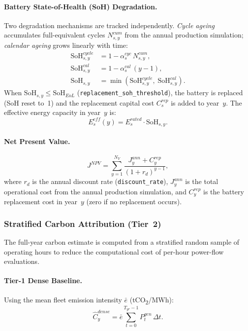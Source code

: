 \paragraph{Battery State-of-Health (SoH) Degradation.}
Two degradation mechanisms are tracked independently.
\textit{Cycle ageing} accumulates full-equivalent cycles $N_{s,y}^{cum}$ from
the annual production simulation; \textit{calendar ageing} grows linearly with
time:
\begin{align}
  \text{SoH}_{s,y}^{cycle} &= 1 - \alpha_s^{cyc}\,N_{s,y}^{cum},
    \label{eq:soh-cyc} \\
  \text{SoH}_{s,y}^{cal}   &= 1 - \alpha_s^{cal}\,(y-1),
    \label{eq:soh-cal} \\
  \text{SoH}_{s,y}         &= \min\!\left(\text{SoH}_{s,y}^{cycle},\;
                               \text{SoH}_{s,y}^{cal}\right).
    \label{eq:soh-combined}
\end{align}
When $\text{SoH}_{s,y} \leq \text{SoH}_{EoL}$
(\texttt{replacement\_soh\_threshold}), the battery is replaced (SoH reset
to~1) and the replacement capital cost $C_s^{rep}$ is added to year~$y$.
The effective energy capacity in year~$y$ is:
\begin{equation}
  E_s^{eff}(y) = E_s^{rated}\cdot\text{SoH}_{s,y}.
\end{equation}

\paragraph{Net Present Value.}
\begin{equation}
  J^{NPV} = \sum_{y=1}^{N_Y} \frac{J_y^{ann} + C_y^{rep}}{(1+r_d)^{y-1}},
  \label{eq:npv}
\end{equation}
where $r_d$ is the annual discount rate (\texttt{discount\_rate}),
$J_y^{ann}$ is the total operational cost from the annual production simulation,
and $C_y^{rep}$ is the battery replacement cost in year~$y$ (zero if no
replacement occurs).

\subsubsection{Stratified Carbon Attribution (Tier~2)}

The full-year carbon estimate is computed from a stratified random sample of
operating hours to reduce the computational cost of per-hour power-flow
evaluations.

\paragraph{Tier-1 Dense Baseline.}
Using the mean fleet emission intensity $\bar{e}$ (tCO\textsubscript{2}/MWh):
\begin{equation}
  \hat{C}_y^{dense} = \bar{e}\sum_{t=0}^{T_{yr}-1} P_t^{gen}\,\Delta t.
  \label{eq:tier1}
\end{equation}

